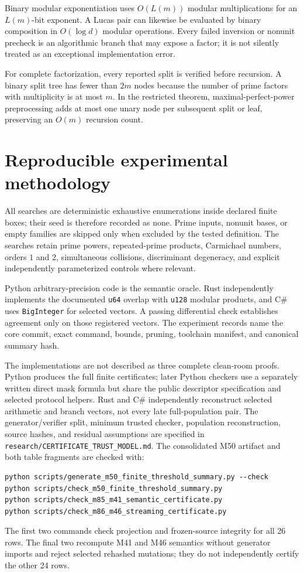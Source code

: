 \documentclass[11pt]{article}
\begin{document}
Binary modular exponentiation uses \(O(L(m))\) modular multiplications for an
\(L(m)\)-bit exponent. A Lucas pair can likewise be evaluated by binary
composition in \(O(\log d)\) modular operations. Every failed inversion or
nonunit precheck is an algorithmic branch that may expose a factor; it is not
silently treated as an exceptional implementation error.

For complete factorization, every reported split is verified before recursion.
A binary split tree has fewer than \(2m\) nodes because the number of prime
factors with multiplicity is at most \(m\). In the restricted theorem,
maximal-perfect-power preprocessing adds at most one unary node per subsequent
split or leaf, preserving an \(O(m)\) recursion count.

\section{Reproducible experimental methodology}

All searches are deterministic exhaustive enumerations inside declared finite
boxes; their seed is therefore recorded as none. Prime inputs, nonunit bases,
or empty families are skipped only when excluded by the tested definition.
The searches retain prime powers, repeated-prime products, Carmichael numbers,
orders \(1\) and \(2\), simultaneous collisions, discriminant degeneracy, and
explicit independently parameterized controls where relevant.

Python arbitrary-precision code is the semantic oracle. Rust independently
implements the documented \texttt{u64} overlap with \texttt{u128} modular
products, and C\# uses \texttt{BigInteger} for selected vectors. A passing
differential check establishes agreement only on those registered vectors.
The experiment records name the core commit, exact command, bounds, pruning,
toolchain manifest, and canonical summary hash.

The implementations are not described as three complete clean-room proofs.
Python produces the full finite certificates; later Python checkers use a
separately written direct mask formula but share the public descriptor
specification and selected protocol helpers. Rust and C\# independently
reconstruct selected arithmetic and branch vectors, not every late
full-population pair. The generator/verifier split, minimum trusted checker,
population reconstruction, source hashes, and residual assumptions are
specified in \texttt{research/CERTIFICATE\_TRUST\_MODEL.md}. The consolidated
M50 artifact and both table fragments are checked with:
\begin{verbatim}
python scripts/generate_m50_finite_threshold_summary.py --check
python scripts/check_m50_finite_threshold_summary.py
python scripts/check_m85_m41_semantic_certificate.py
python scripts/check_m86_m46_streaming_certificate.py
\end{verbatim}
The first two commands check projection and frozen-source integrity for all
26 rows. The final two recompute M41 and M46 semantics without generator
imports and reject selected rehashed mutations; they do not independently
certify the other 24 rows.
\end{document}
